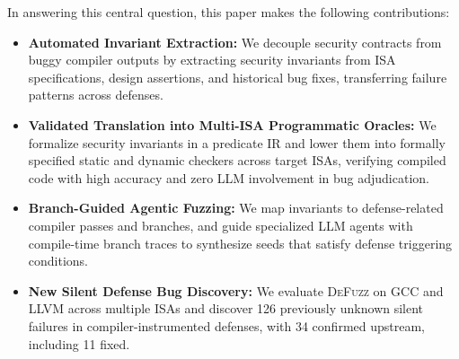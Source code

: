 \documentclass[conference]{IEEEtran}
\begin{document}
In answering this central question, this paper makes the following contributions:
\begin{itemize}
  \item \textbf{Automated Invariant Extraction:} We decouple security contracts from buggy compiler outputs by extracting security invariants from ISA specifications, design assertions, and historical bug fixes, transferring failure patterns across defenses.
  \item \textbf{Validated Translation into Multi-ISA Programmatic Oracles:} We formalize security invariants in a predicate IR and lower them into formally specified static and dynamic checkers across target ISAs, verifying compiled code with high accuracy and zero LLM involvement in bug adjudication.
  \item \textbf{Branch-Guided Agentic Fuzzing:} We map invariants to defense-related compiler passes and branches, and guide specialized LLM agents with compile-time branch traces to synthesize seeds that satisfy defense triggering conditions.
  \item \textbf{New Silent Defense Bug Discovery:} We evaluate \textsc{DeFuzz} on GCC and LLVM across multiple ISAs and discover 126 previously unknown silent failures in compiler-instrumented defenses, with 34 confirmed upstream, including 11 fixed.
\end{itemize}
\end{document}
